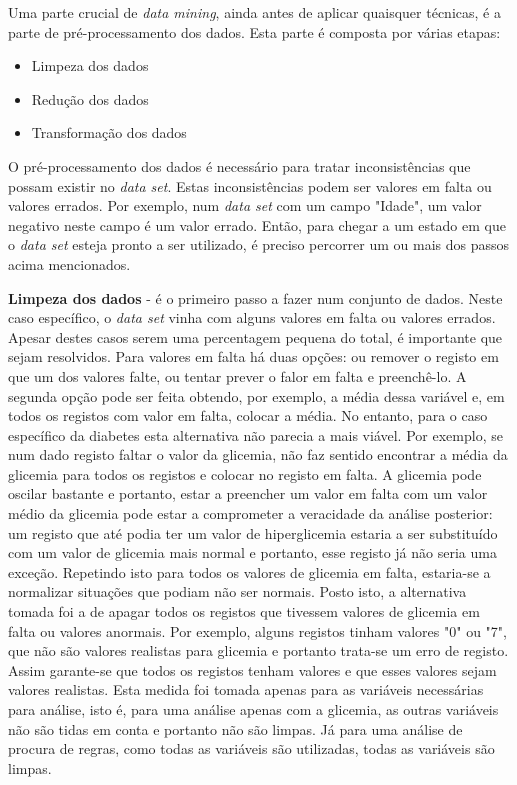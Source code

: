 Uma parte crucial de \textit{data mining}, ainda antes de aplicar quaisquer técnicas, é a parte de pré-processamento dos dados. Esta parte é composta por várias etapas:

\begin{itemize}
\item Limpeza dos dados
\item Redução dos dados
\item Transformação dos dados
\end{itemize}
 
O pré-processamento dos dados é necessário para tratar inconsistências que possam existir no \textit{data set}. Estas inconsistências podem ser valores em falta ou valores errados. Por exemplo, num \textit{data set} com um campo "Idade", um valor negativo neste campo é um valor errado. Então, para chegar a um estado em que o \textit{data set} esteja pronto a ser utilizado, é preciso percorrer um ou mais dos passos acima mencionados. 

\textbf{Limpeza dos dados} - é o primeiro passo a fazer num conjunto de dados. Neste caso específico, o \textit{data set} vinha com alguns valores em falta ou valores errados. Apesar destes casos serem uma percentagem pequena do total, é importante que sejam resolvidos. Para valores em falta há duas opções: ou remover o registo em que um dos valores falte, ou tentar prever o falor em falta e preenchê-lo. A segunda opção pode ser feita obtendo, por exemplo, a média dessa variável e, em todos os registos com valor em falta, colocar a média. No entanto, para o caso específico da diabetes esta alternativa não parecia a mais viável. Por exemplo, se num dado registo faltar o valor da glicemia, não faz sentido encontrar a média da glicemia para todos os registos e colocar no registo em falta. A glicemia pode oscilar bastante e portanto, estar a preencher um valor em falta com um valor médio da glicemia pode estar a comprometer a veracidade da análise posterior: um registo que até podia ter um valor de hiperglicemia estaria a ser substituído com um valor de glicemia mais normal e portanto, esse registo já não seria uma exceção. Repetindo isto para todos os valores de glicemia em falta, estaria-se a normalizar situações que podiam não ser normais. Posto isto, a alternativa tomada foi a de apagar todos os registos que tivessem valores de glicemia em falta ou valores anormais. Por exemplo, alguns registos tinham valores "0" ou "7", que não são valores realistas para glicemia e portanto trata-se um erro de registo. Assim garante-se que todos os registos tenham valores e que esses valores sejam valores realistas. Esta medida foi tomada apenas para as variáveis necessárias para análise, isto é, para uma análise apenas com a glicemia, as outras variáveis não são tidas em conta e portanto não são limpas. Já para uma análise de procura de regras, como todas as variáveis são utilizadas, todas as variáveis são limpas. 


